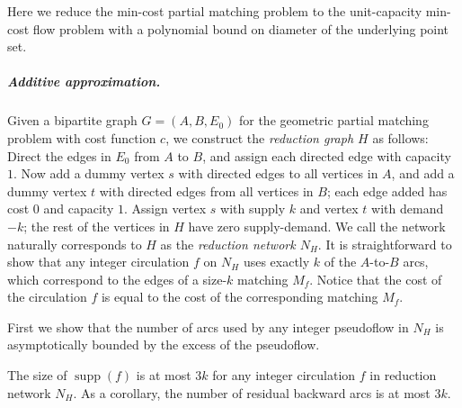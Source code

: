\documentclass[a4paper,UKenglish]{socg-lipics-v2018}
\def\eps{\varepsilon}
\def\set#1{\{ #1 \}}
\def\supp{\operatorname{supp}}
\theoremstyle{plain}
\numberwithin{figure}{section}
\renewcommand{\paragraph}{\subparagraph}
\def\EMPH#1{\textcolor{BrickRed}{{\emph{#1}}}}
\begin{document}
Here we reduce the min-cost partial matching problem to the unit-capacity min-cost flow problem with a polynomial bound on diameter of the underlying point set.


\paragraph{Additive approximation.}
Given a bipartite graph $G = (A,B,E_0)$ for the geometric partial matching problem with cost function $c$, we construct the \EMPH{reduction graph $H$} as follows:
Direct the edges in $E_0$ from $A$ to $B$, and assign each directed edge with capacity $1$.  Now add a dummy vertex $s$ with directed edges to all vertices in $A$, and add a dummy vertex $t$ with directed edges from all vertices in $B$; each edge added has cost $0$ and capacity $1$.
Assign vertex $s$ with supply $k$ and vertex $t$ with demand $-k$; the rest of the vertices in $H$ have zero supply-demand.
We call the network naturally corresponds to $H$ as the \EMPH{reduction network $N_H$}.
%
It is straightforward to show that any integer circulation $f$ on $N_H$ uses exactly
$k$ of the $A$-to-$B$ arcs, which correspond to the edges of a size-$k$
matching \EMPH{$M_f$}.
Notice that the cost of the circulation $f$ is equal to the cost of the corresponding matching $M_f$.
%

First we show that the number of arcs used by any integer pseudoflow in $N_H$ is asymptotically bounded by the excess of the pseudoflow.

\begin{lemmarep}
\label{lemma:support_size}
The size of $\supp(f)$ is at most $3k$ for any integer circulation $f$ in reduction network $N_H$.
As a corollary, the number of residual backward arcs is at most $3k$.
\end{lemmarep}
\end{document}
